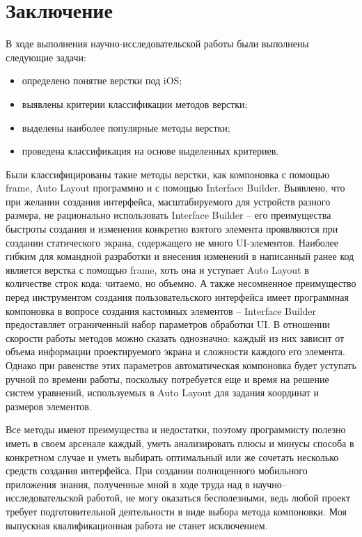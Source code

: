 \chapter*{Заключение}

В ходе выполнения научно-исследовательской работы были выполнены следующие задачи: 

\begin{itemize}[label=---]
	\item определено понятие верстки под iOS;
	\item выявлены критерии классификации методов верстки;
	\item выделены наиболее популярные методы верстки;
	\item проведена классификация на основе выделенных критериев.	
\end{itemize}

Были классифицированы такие методы верстки, как компоновка с помощью frame, Auto Layout программно и с помощью Interface Builder. 
Выявлено, что при желании создания интерфейса, масштабируемого для устройств разного размера, не рационально использовать Interface Builder -- его преимущества быстроты создания и изменения конкретно взятого элемента проявляются при создании статического экрана, содержащего не много UI-элементов. 
Наиболее гибким для командной разработки и внесения изменений в написанный ранее код является верстка с помощью frame, хоть она и уступает Auto Layout в количестве строк кода: читаемо, но объемно. 
А также несомненное преимущество перед инструментом создания пользовательского интерфейса имеет программная компоновка в вопросе создания кастомных элементов -- Interface Builder предоставляет ограниченный набор параметров обработки UI. 
В отношении скорости работы методов можно сказать однозначно: каждый из них зависит от объема информации проектируемого экрана и сложности каждого его элемента. 
Однако при равенстве этих параметров автоматическая компоновка будет уступать ручной по времени работы, поскольку потребуется еще и время на решение систем уравнений, используемых в Auto Layout для задания координат и размеров элементов. 

Все методы имеют преимущества и недостатки, поэтому программисту полезно иметь в своем арсенале каждый, уметь анализировать плюсы и минусы способа в конкретном случае и уметь выбирать оптимальный или же сочетать несколько средств создания интерфейса. При создании полноценного мобильного приложения знания, полученные мной в ходе труда над в научно--исследовательской работой, не могу оказаться бесполезными, ведь любой проект требует подготовительной деятельности в виде выбора метода компоновки. Моя выпускная квалификационная работа не станет исключением.

